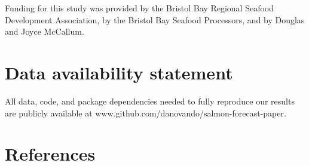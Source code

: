 \documentclass[
]{article}
\begin{document}
Funding for this study was provided by the Bristol Bay Regional Seafood Development Association, by the Bristol Bay Seafood Processors, and by Douglas and Joyce McCallum.

\hypertarget{data-availability-statement}{%
\section*{Data availability statement}\label{data-availability-statement}}

All data, code, and package dependencies needed to fully reproduce our results are publicly available at www.github.com/danovando/salmon-forecast-paper.

\hypertarget{references}{%
\section{References}\label{references}}
\end{document}
